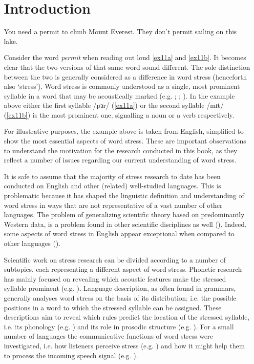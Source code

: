 \chapter{Introduction} \label{chInt}

\ea 
\ea You need a permit to climb Mount Everest. \label{ex11a}
\ex They don't permit sailing on this lake. \label{ex11b}
\z
\z

Consider the word \textit{permit} when reading out loud \ref{ex11a} and \ref{ex11b}. It becomes clear that the two versions of that same word sound different. The sole distinction between the two is generally considered as a difference in word stress (henceforth also `stress'). Word stress is commonly understood as a single, most prominent syllable in a word that may be acoustically marked (e.g. \citealt{hyman_word-prosodic_2006}; \citealt{ladd_intonational_2008}; \citealt{gordon_acoustic_2017}). In the example above either the first syllable /pɜr/ (\ref{ex11a}) or the second syllable /mɪt/ (\ref{ex11b}) is the most prominent one, signalling a noun or a verb respectively.

For illustrative purposes, the example above is taken from English, simplified to show the most essential aspects of word stress. These are important observations to understand the motivation for the research conducted in this book, as they reflect a number of issues regarding our current understanding of word stress.

It is safe to assume that the majority of stress research to date has been conducted on English and other (related) well-studied languages. This is problematic because it has shaped the linguistic definition and understanding of word stress in ways that are not representative of a vast number of other languages. The problem of generalizing scientific theory based on predominantly Western data, is a problem found in other scientific disciplines as well (\citealt{henrich_weirdest_2010}). Indeed, some aspects of word stress in English appear exceptional when compared to other languages (\citealt{cutler_native_2012}).

Scientific work on stress research can be divided according to a number of subtopics, each representing a different aspect of word stress. Phonetic research has mainly focused on revealing which acoustic features make the stressed syllable prominent (e.g. \citealt{gordon_acoustic_2017}). Language description, as often found in grammars, generally analyses word stress on the basis of its distribution; i.e. the possible positions in a word to which the stressed syllable can be assigned. These descriptions aim to reveal which rules predict the location of the stressed syllable, i.e. its phonology (e.g. \citealt{hyman_word-prosodic_2006}) and its role in prosodic structure (e.g. \citealt{gordon_disentangling_2014}). For a small number of languages the communicative functions of word stress were investigated, i.e. how listeners perceive stress (e.g. \citealt{peperkamp_typological_2002}) and how it might help them to process the incoming speech signal (e.g. \citealt{cutler_lexical_2005}).

